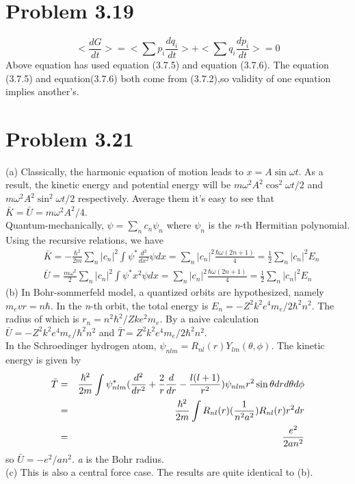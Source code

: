 \documentclass{article}
\begin{document}
\section*{Problem 3.19}
	\begin{equation*}
		<\frac{dG}{dt}>=<\sum p_i \frac{dq_i}{dt}>+<\sum q_i \frac{dp_i}{dt}>=0
	\end{equation*}
	Above equation has used equation (3.7.5) and equation (3.7.6).
	The equation (3.7.5) and equation(3.7.6)  both come from (3.7.2),so validity of one equation implies another's.
	

\section*{Problem 3.21}
	\noindent (a) Classically, the harmonic equation of motion leads to $x = A \sin \omega t$. As a result, the kinetic energy and potential energy will be $m \omega^{2} A^{2} \cos^{2} \omega t /2$ and $m \omega^{2} A^{2} \sin^{2} \omega t /2$ respectively. Average them it's easy to see that $\bar{K} = \bar{U} =m \omega^{2} A^{2}/4$.\\
	Quantum-mechanically, $\psi = \sum_{n} c_{n} \psi_{n}$ where $\psi_{n}$ is the \emph{n}-th Hermitian polynomial. Using the recursive relations, we have
	\begin{align}
	&\bar{K} = -\frac{\hbar^{2}}{2m} \sum_{n} |c_{n}|^{2} \int \psi^{*} \frac{d^{2}}{dx^{2}} \psi dx = \sum_{n} |c_{n}|^{2} \frac{\hbar \omega (2n+1)}{4} = \frac{1}{2} \sum_{n} |c_{n}|^{2} E_{n}\\
	&\bar{U} = \frac{m \omega^{2}}{2} \sum_{n} |c_{n}|^{2} \int \psi^{*} x^{2} \psi dx= \sum_{n} |c_{n}|^{2} \frac{\hbar \omega (2n+1)}{4} = \frac{1}{2} \sum_{n} |c_{n}|^{2} E_{n}
	\end{align}
	\noindent (b) In Bohr-sommerfeld model, a quantized orbits are hypothesized, namely $m_{e}vr = n \hbar$. In the \emph{n}-th orbit, the total energy is $E_{n} = - Z^{2}k^{2}e^{4}m_{e}/2 \hbar^{2} n^{2}$. The radius of which is $r_{n} = n^{2} \hbar^{2} / Zke^{2}m_{e}$. By a naive calculation $\bar{U} = - Z^{2}k^{2}e^{4}m_{e}/ \hbar^{2} n^{2}$ and $\bar{T} = Z^{2}k^{2}e^{4}m_{e}/2 \hbar^{2} n^{2}$.\\
	In the Schroedinger hydrogen atom, $\psi_{nlm} = R_{nl}(r) Y_{lm}(\theta, \phi)$. The kinetic energy is given by
	\begin{eqnarray}
	\bar{T} &=& \frac{\hbar^{2}}{2m} \int \psi^{*}_{nlm} (\frac{d^{2}}{dr^{2}} + \frac{2}{r} \frac{d}{dr} - \frac{l(l+1)}{r^{2}})\psi_{nlm} r^{2} \sin \theta dr d\theta d\phi \notag \\
	&=& \frac{\hbar^{2}}{2m} \int R_{nl}(r) (\frac{1}{n^{2}a^{2}}) R_{nl}(r) r^{2}dr \notag \\
	&=& \frac{e^{2}}{2a n^{2}}
	\end{eqnarray}
	so $\bar{U} = - e^{2}/a n^{2}$. \emph{a} is the Bohr radius.\\
	\noindent (c) This is also a central force case. The results are quite identical to (b).
\end{document}
